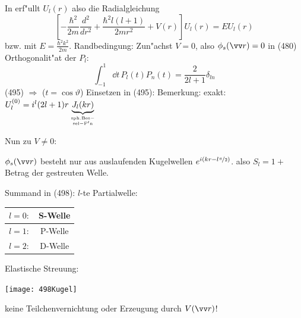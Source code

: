 \documentclass[a4paper]{scrartcl}
\begin{document}
In
erf"ullt $U_l(r)$ also die Radialgleichung
$$ \left[ - \frac{ \hbar^2}{2m} \frac{d^2}{dr^2} + \frac{\hbar^2 l(l+1)}{2mr^2} + V(r) \right] U_l(r) = E U_l (r)$$
bzw.
mit $E = \frac{\hbar^2 k^2}{2m}$.
Randbedingung:
Zun"achst $V=0$, also $\phi_s(\vv r) = 0$ in (480)
Orthogonalit"at der $P_l$:
$$\int_{-1}^1 \dd t \, P_l(t) P_n (t) = \frac{2}{2l +1} \delta_{l n}$$
(495) $\Longrightarrow$ ($t = \cos \vartheta$)
Einsetzen in (495):
Bemerkung: exakt: $U_l^{(0)} = i^l (2l + 1) r \underbrace{J_l(kr)}_{\mathrm{sph. Bes- \atop sel-F'n}}$

Nun zu $V \neq 0$:

$\phi_s(\vv r)$ besteht nur aus auslaufenden Kugelwellen $e^{i(kr - l\nicefrac \pi 2)}$.
also $S_l = 1 + $ Betrag der gestreuten Welle.

Summand in (498): $l$-te Partialwelle:
\begin{center}
\begin{tabular}{c | c}
$l=0:$ & S-Welle \\
\hline
$l=1:$ & P-Welle \\
\hline
$l=2:$ & D-Welle
\end{tabular}
\end{center}
Elastische Streuung:
\begin{center}
\texttt{[image: 498Kugel]}
\end{center}
keine Teilchenvernichtung oder Erzeugung durch $V(\vv r)$!
\end{document}
